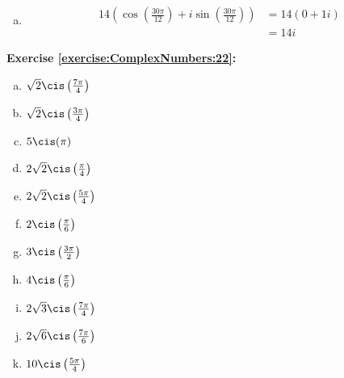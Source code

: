 \begin{enumerate}[(a)]
\item
\begin{align*}
14\left(\cos\left(\frac{30\pi}{12}\right) + i\sin\left(\frac{30\pi}{12}\right)\right) &= 14(0 + 1i)\\
&= 14i 
\end{align*}
\end{enumerate}

\noindent\textbf{Exercise \ref{exercise:ComplexNumbers:22}:} %
\begin{multicols}{3}
\begin{enumerate}[(a)]
\item
$\sqrt{2}\cis\left(\frac{7\pi}{4}\right)$

\item
$\sqrt{2}\cis\left(\frac{3\pi}{4}\right)$

\item
$5\cis(\pi)$

\item
$2\sqrt{2}\cis\left(\frac{\pi}{4}\right)$

\item
$2\sqrt{2}\cis\left(\frac{5\pi}{4}\right)$

\item
$2\cis\left(\frac{\pi}{6}\right)$

\item
$3\cis\left(\frac{3\pi}{2}\right)$

\item
$4\cis\left(\frac{\pi}{6}\right)$

\item
$2\sqrt{3}\cis\left(\frac{7\pi}{4}\right)$

\item
$2\sqrt{6}\cis\left(\frac{7\pi}{6}\right)$

\item
$10\cis\left(\frac{5\pi}{4}\right)$
\end{enumerate}
\end{multicols}

